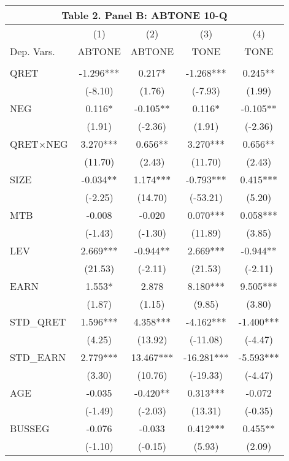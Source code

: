 \begin{table}[htbp] \label{T2PB}
  \centering
    \begin{tabular}{lcccc}
    \multicolumn{5}{c}{\textbf{Table 2. Panel B: ABTONE 10-Q}} \\
    \midrule
      & (1) & (2) & (3) & (4) \\
    Dep. Vars. & ABTONE & ABTONE & TONE & TONE \\
    \midrule
      &   &   &   &  \\
    QRET & -1.296*** & 0.217* & -1.268*** & 0.245** \\
      & (-8.10) & (1.76) & (-7.93) & (1.99) \\
    NEG & 0.116* & -0.105** & 0.116* & -0.105** \\
      & (1.91) & (-2.36) & (1.91) & (-2.36) \\
    \rowcolor[rgb]{ .933,  .925,  .882} QRET$\times$NEG & 3.270*** & 0.656** & 3.270*** & 0.656** \\
    \rowcolor[rgb]{ .933,  .925,  .882}   & (11.70) & (2.43) & (11.70) & (2.43) \\
    SIZE & -0.034** & 1.174*** & -0.793*** & 0.415*** \\
      & (-2.25) & (14.70) & (-53.21) & (5.20) \\
    MTB & -0.008 & -0.020 & 0.070*** & 0.058*** \\
      & (-1.43) & (-1.30) & (11.89) & (3.85) \\
    LEV & 2.669*** & -0.944** & 2.669*** & -0.944** \\
      & (21.53) & (-2.11) & (21.53) & (-2.11) \\
    EARN & 1.553* & 2.878 & 8.180*** & 9.505*** \\
      & (1.87) & (1.15) & (9.85) & (3.80) \\
    STD\_QRET & 1.596*** & 4.358*** & -4.162*** & -1.400*** \\
      & (4.25) & (13.92) & (-11.08) & (-4.47) \\
    STD\_EARN & 2.779*** & 13.467*** & -16.281*** & -5.593*** \\
      & (3.30) & (10.76) & (-19.33) & (-4.47) \\
    AGE & -0.035 & -0.420** & 0.313*** & -0.072 \\
      & (-1.49) & (-2.03) & (13.31) & (-0.35) \\
    BUSSEG & -0.076 & -0.033 & 0.412*** & 0.455** \\
      & (-1.10) & (-0.15) & (5.93) & (2.09) \\

\end{tabular}
\end{table}
